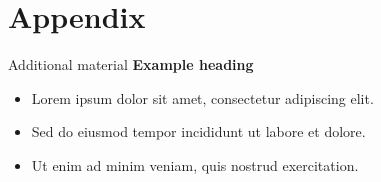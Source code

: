 \section{Appendix}

\begin{frame}[t]{Additional material}
    \textbf{Example heading}
    \begin{itemize}
        \item Lorem ipsum dolor sit amet, consectetur adipiscing elit.
        \item Sed do eiusmod tempor incididunt ut labore et dolore.
        \item Ut enim ad minim veniam, quis nostrud exercitation.
    \end{itemize}
\end{frame}
